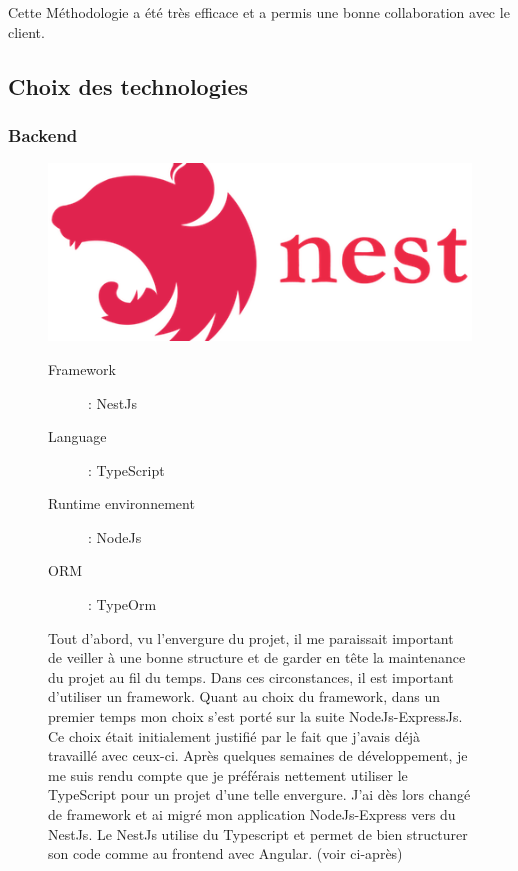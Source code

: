 \newpara

Cette Méthodologie a été très efficace et a permis une bonne collaboration avec le client. 

\subsection{Choix des technologies}
\subsubsection{Backend}
\begin{figure}[H]
  \begin{minipage}{.3\textwidth}
    \includegraphics[width=0.75\linewidth]{img/tech/NestJs.png} 
  \end{minipage}
  \begin{minipage}{.7\textwidth}
    \begin{description}
      \item[Framework]: NestJs
      \item[Language]: TypeScript
      \item[Runtime environnement]: NodeJs  
      \item[ORM]: TypeOrm 
    \end{description}
    Tout d'abord, vu l'envergure du projet, il me paraissait important de veiller à une bonne structure et de garder en tête la maintenance du projet au fil du temps. Dans ces circonstances, il est important d'utiliser un framework. Quant au choix du framework, dans un premier temps mon choix s'est porté sur la suite NodeJs-ExpressJs. Ce choix était initialement justifié par le fait que j'avais déjà travaillé avec ceux-ci. Après quelques semaines de développement, je me suis rendu compte que je préférais nettement utiliser le TypeScript pour un projet d'une telle envergure. J'ai dès lors changé de framework et ai migré mon application NodeJs-Express vers du NestJs. Le NestJs utilise du Typescript et permet de bien structurer son code comme au frontend avec Angular. (voir ci-après)
  \end{minipage}
\end{figure}

